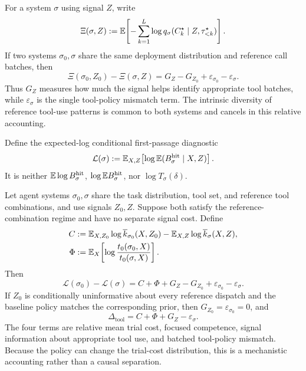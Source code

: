 \begin{lemma}
\label{lem:tool-cross-entropy}
For a system \(\sigma\) using signal \(Z\), write
\[
\Xi(\sigma,Z)
:=
\mathbb{E}\!\left[-\sum_{k=1}^{L}
\log q_\sigma(C_k^\star\mid Z,\tau_{<k}^\star)\right].
\]
If two systems \(\sigma_0,\sigma\) share the same deployment distribution and
reference call batches, then
\begin{equation}
\Xi(\sigma_0,Z_0)-\Xi(\sigma,Z)
=G_Z-G_{Z_0}+\varepsilon_{\sigma_0}-\varepsilon_\sigma.
\label{eq:tool-cross-entropy}
\end{equation}
Thus \(G_Z\) measures how much the signal helps identify appropriate tool
batches, while \(\varepsilon_\sigma\) is the single tool-policy mismatch term.
The intrinsic diversity of reference tool-use patterns is common to both
systems and cancels in this relative accounting.
\end{lemma}

Define the expected-log conditional first-passage diagnostic
\begin{equation}
\mathcal L(\sigma):=\mathbb{E}_{X,Z}\!\left[
\log\mathbb{E}(B_\sigma^{\mathrm{hit}}\mid X,Z)\right].
\label{eq:tool-risk}
\end{equation}
It is neither \(\mathbb{E}\log B_\sigma^{\mathrm{hit}}\),
\(\log\mathbb{E} B_\sigma^{\mathrm{hit}}\), nor \(\log T_\sigma(\delta)\).

\begin{theorem}
\label{thm:four-term}
Let agent systems \(\sigma_0,\sigma\) share the task distribution, tool set,
and reference tool combinations, and use signals \(Z_0,Z\).  Suppose both satisfy the
reference-combination regime and have no separate signal cost.  Define
\begin{align*}
C&:=\mathbb{E}_{X,Z_0}\log\overline k_{\sigma_0}(X,Z_0)
-\mathbb{E}_{X,Z}\log\overline k_\sigma(X,Z),\\
\Phi&:=\mathbb{E}_X\!\left[\log\frac{t_0(\sigma_0,X)}{t_0(\sigma,X)}\right].
\end{align*}
Then
\begin{equation}
\mathcal L(\sigma_0)-\mathcal L(\sigma)
=C+\Phi+G_Z-G_{Z_0}+\varepsilon_{\sigma_0}-\varepsilon_\sigma.
\label{eq:four-term-general}
\end{equation}
If \(Z_0\) is conditionally uninformative about every reference dispatch
and the baseline policy matches the corresponding prior, then
\(G_{Z_0}=\varepsilon_{\sigma_0}=0\), and
\begin{equation}
\boxed{\Delta_{\mathrm{tool}}=C+\Phi+G_Z-\varepsilon_\sigma.}
\label{eq:four-term-baseline}
\end{equation}
The four terms are relative mean trial cost, focused competence, signal
information about appropriate tool use, and batched tool-policy mismatch.
Because the policy can change the trial-cost distribution, this is a
mechanistic accounting rather than a causal separation.
\end{theorem}

